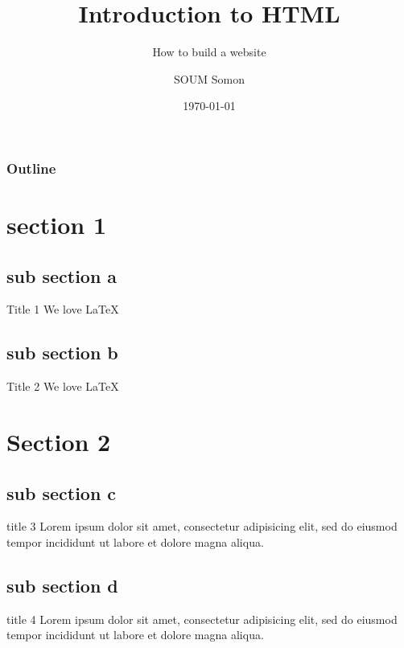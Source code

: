 \documentclass{beamer}
\title{Introduction to HTML}
\subtitle{How to build a website}
\author{SOUM Somon}
\institute{Institute of Technology of Cambodia}
\date{\today}
\begin{document}
	\begin{frame}
		\titlepage
	\end{frame}
	\begin{frame}
		\frametitle{Outline}
		\tableofcontents
	\end{frame}
		\section{section 1}
		\subsection{sub section a}
		\begin{frame}{Title 1}
				We love \LaTeX{}
		\end{frame}
		\subsection{sub section b}
		\begin{frame}{Title 2}
				We love \LaTeX{}
		\end{frame}
	\section{Section 2}
	\subsection{sub section c}
	\begin{frame}{title 3 }
		Lorem ipsum dolor sit amet, consectetur adipisicing elit, sed do eiusmod tempor incididunt ut labore et dolore magna aliqua.
	\end{frame}
	\subsection{sub section  d}
	\begin{frame}{title 4}
			Lorem ipsum dolor sit amet, consectetur adipisicing elit, sed do eiusmod tempor incididunt ut labore et dolore magna aliqua.
	\end{frame}
\end{document}
